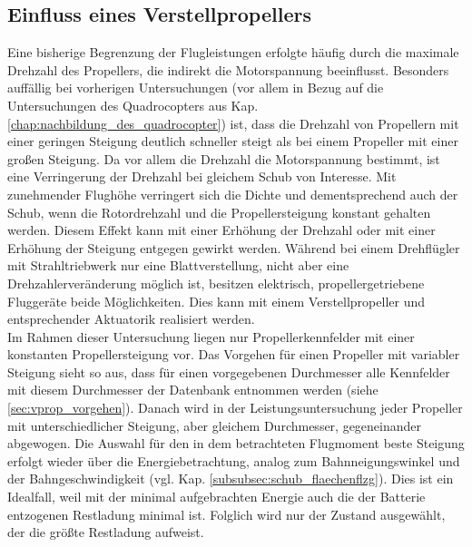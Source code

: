 \subsection{Einfluss eines Verstellpropellers}
\label{subsec:verstellprop}
Eine bisherige Begrenzung der Flugleistungen erfolgte häufig durch die maximale Drehzahl des Propellers, die indirekt die Motorspannung beeinflusst. 
Besonders auffällig bei vorherigen Untersuchungen (vor allem in Bezug auf die Untersuchungen des Quadrocopters aus Kap. \ref{chap:nachbildung_des_quadrocopter}) ist, dass die Drehzahl von Propellern mit einer geringen Steigung deutlich schneller steigt als bei einem Propeller mit einer großen Steigung. Da vor allem die Drehzahl die Motorspannung bestimmt, ist eine Verringerung der Drehzahl bei gleichem Schub von Interesse. Mit zunehmender Flughöhe verringert sich die Dichte und dementsprechend auch der Schub, wenn die Rotordrehzahl und die Propellersteigung konstant gehalten werden. Diesem Effekt kann mit einer Erhöhung der Drehzahl oder mit einer Erhöhung der Steigung entgegen gewirkt werden. Während bei einem Drehflügler mit Strahltriebwerk nur eine Blattverstellung, nicht aber eine Drehzahlerveränderung möglich ist, besitzen elektrisch, propellergetriebene Fluggeräte beide Möglichkeiten. Dies kann mit einem Verstellpropeller und entsprechender Aktuatorik realisiert werden. \\
Im Rahmen dieser Untersuchung liegen nur Propellerkennfelder mit einer konstanten Propellersteigung vor. Das Vorgehen für einen Propeller mit variabler Steigung sieht so aus, dass für einen vorgegebenen Durchmesser alle Kennfelder mit diesem Durchmesser der Datenbank entnommen werden (siehe \ref{sec:vprop_vorgehen}). Danach wird in der Leistungsuntersuchung jeder Propeller mit unterschiedlicher Steigung, aber gleichem Durchmesser, gegeneinander abgewogen. Die Auswahl für den in dem betrachteten Flugmoment beste Steigung erfolgt wieder über die Energiebetrachtung, analog zum Bahnneigungswinkel und der Bahngeschwindigkeit (vgl. Kap. \ref{subsubsec:schub_flaechenflzg}). Dies ist ein Idealfall, weil mit der minimal aufgebrachten Energie auch die der Batterie entzogenen Restladung minimal ist. Folglich wird nur der Zustand ausgewählt, der die größte Restladung aufweist.

